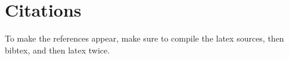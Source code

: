 \section{Citations}

To make the references appear, make sure to compile the latex sources, then bibtex, and then latex twice.